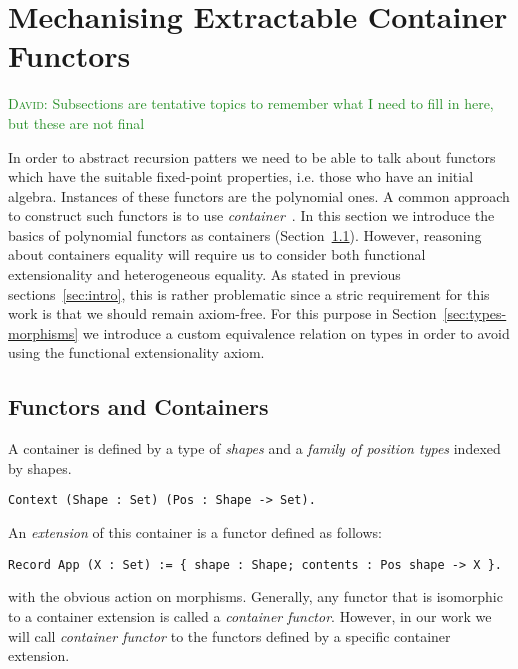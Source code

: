 \documentclass[a4paper, UKenglish, cleveref, autoref, thm-restate]{lipics-v2021}
\newcommand{\dcas}[1]{\textcolor{ForestGreen}{\textsc{David}: #1}}
\newcommand{\R}{\mathbb{R}}
\newcommand{\operator}[1]{\textsf{#1}}
\begin{document}

\section{Mechanising Extractable Container Functors}
\dcas{Subsections are tentative topics to remember what I need to fill in here,
but these are not final}

In order to abstract recursion patters we need to be able to talk about functors
which have the suitable fixed-point properties, i.e. those who have an initial
algebra. Instances of these functors are the polynomial ones.  A common approach
to construct such functors is to use \emph{container}~\cite{AbbottAG05}.  In
this section we introduce the basics of polynomial functors as containers
(Section~\ref{sec:containers}).  However, reasoning about containers equality
will require us to consider both functional extensionality and heterogeneous
equality. As stated in previous sections~\ref{sec:intro}, this is rather
problematic since a stric requirement for this work is that we should remain
axiom-free. For this purpose in Section~\ref{sec:types-morphisms} we introduce
a custom equivalence relation on types in order to avoid using the functional
extensionality axiom.

\subsection{Functors and Containers}
\label{sec:containers}
A container is defined by a type of \emph{shapes} and a \emph{family of position
types} indexed by shapes.
\begin{verbatim}
Context (Shape : Set) (Pos : Shape -> Set).
\end{verbatim}
An \emph{extension} of this container is a functor defined as follows:
\begin{verbatim}
Record App (X : Set) := { shape : Shape; contents : Pos shape -> X }.
\end{verbatim}
with the obvious action on morphisms. Generally, any functor that is isomorphic
to a container extension is called a \emph{container functor}. However, in our
work we will call \emph{container functor} to the functors defined by a specific
container extension.
\end{document}
